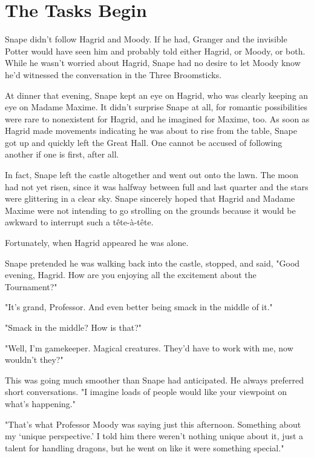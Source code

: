 
\chapter{The Tasks Begin}

Snape didn't follow Hagrid and Moody. If he had, Granger and the invisible Potter would have seen him and probably told either Hagrid, or Moody, or both. While he wasn't worried about Hagrid, Snape had no desire to let Moody know he'd witnessed the conversation in the Three Broomsticks.

At dinner that evening, Snape kept an eye on Hagrid, who was clearly keeping an eye on Madame Maxime. It didn't surprise Snape at all, for romantic possibilities were rare to nonexistent for Hagrid, and he imagined for Maxime, too. As soon as Hagrid made movements indicating he was about to rise from the table, Snape got up and quickly left the Great Hall. One cannot be accused of following another if one is first, after all.

In fact, Snape left the castle altogether and went out onto the lawn. The moon had not yet risen, since it was halfway between full and last quarter and the stars were glittering in a clear sky. Snape sincerely hoped that Hagrid and Madame Maxime were not intending to go strolling on the grounds because it would be awkward to interrupt such a tête-à-tête.

Fortunately, when Hagrid appeared he was alone.

Snape pretended he was walking back into the castle, stopped, and said, "Good evening, Hagrid. How are you enjoying all the excitement about the Tournament?"

"It's grand, Professor. And even better being smack in the middle of it."

"Smack in the middle? How is that?"

"Well, I'm gamekeeper. Magical creatures. They'd have to work with me, now wouldn't they?"

This was going much smoother than Snape had anticipated. He always preferred short conversations. "I imagine loads of people would like your viewpoint on what's happening."

"That's what Professor Moody was saying just this afternoon. Something about my `unique perspective.' I told him there weren't nothing unique about it, just a talent for handling dragons, but he went on like it were something special."

